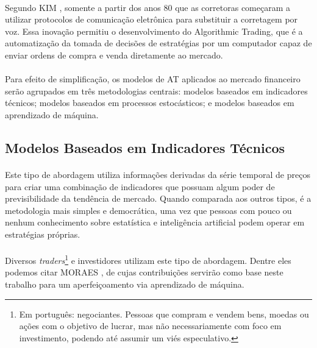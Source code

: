 \paragraph{} Segundo KIM \cite{kim2010electronic}, somente a partir dos anos 80 que as corretoras começaram a utilizar protocolos de comunicação eletrônica para substituir a corretagem por voz. Essa inovação permitiu o desenvolvimento do Algorithmic Trading, que é a automatização da tomada de decisões de estratégias por um computador capaz de enviar ordens de compra e venda diretamente ao mercado.

\paragraph{} Para efeito de simplificação, os modelos de AT aplicados ao mercado financeiro serão agrupados em três metodologias centrais: modelos baseados em indicadores técnicos; modelos baseados em processos estocásticos; e modelos baseados em aprendizado de máquina.


\subsection{Modelos Baseados em Indicadores Técnicos}

\paragraph{} Este tipo de abordagem utiliza informações derivadas da série temporal de preços para criar uma combinação de indicadores que possuam algum poder de previsibilidade da tendência de mercado. Quando comparada aos outros tipos, é a metodologia mais simples e democrática, uma vez que pessoas com pouco ou nenhum conhecimento sobre estatística e inteligência artificial podem operar em estratégias próprias.

\paragraph{} Diversos \textit{traders}\footnote{Em português: negociantes. Pessoas que compram e vendem bens, moedas ou ações com o objetivo de lucrar, mas não necessariamente com foco em investimento, podendo até assumir um viés especulativo.} e investidores utilizam este tipo de abordagem. Dentre eles podemos citar MORAES \cite{moraes2007se}, de cujas contribuições servirão como base neste trabalho para um aperfeiçoamento via aprendizado de máquina.



